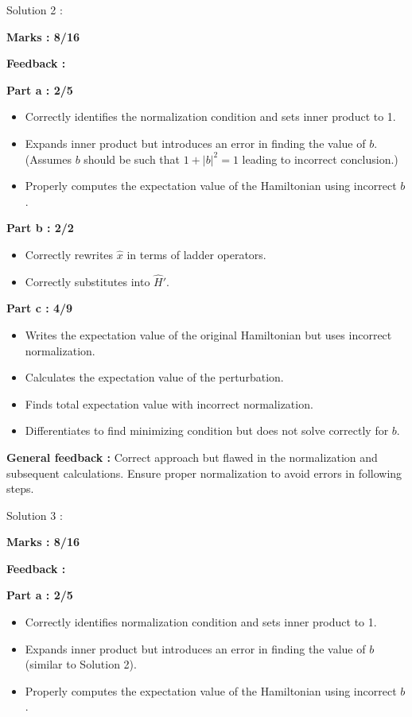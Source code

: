 \documentclass[a4paper,11pt]{article}
\begin{document}
Solution 2 :

\textbf{Marks : 8/16}

\textbf{Feedback :}

\textbf{Part a : 2/5}

\begin{itemize}
    \item Correctly identifies the normalization condition and sets inner product to 1.
    \item Expands inner product but introduces an error in finding the value of $b$. (Assumes $b$ should be such that $1 + |b|^2 = 1$ leading to incorrect conclusion.)
    \item Properly computes the expectation value of the Hamiltonian using incorrect $b$.
\end{itemize}

\textbf{Part b : 2/2}

\begin{itemize}
    \item Correctly rewrites $\hat{x}$ in terms of ladder operators.
    \item Correctly substitutes into $\hat{H}'$.
\end{itemize}

\textbf{Part c : 4/9}

\begin{itemize}
    \item Writes the expectation value of the original Hamiltonian but uses incorrect normalization.
    \item Calculates the expectation value of the perturbation.
    \item Finds total expectation value with incorrect normalization.
    \item Differentiates to find minimizing condition but does not solve correctly for $b$.
\end{itemize}

\textbf{General feedback :}
Correct approach but flawed in the normalization and subsequent calculations. Ensure proper normalization to avoid errors in following steps.



Solution 3 :

\textbf{Marks : 8/16}

\textbf{Feedback :}

\textbf{Part a : 2/5}

\begin{itemize}
    \item Correctly identifies normalization condition and sets inner product to 1.
    \item Expands inner product but introduces an error in finding the value of $b$ (similar to Solution 2).
    \item Properly computes the expectation value of the Hamiltonian using incorrect $b$.
\end{itemize}
\end{document}
